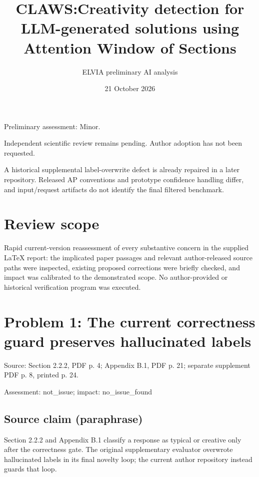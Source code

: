 \documentclass[11pt]{article}
\begin{document}
\title{CLAWS:Creativity detection for LLM-generated solutions using Attention Window of Sections}

\author{ELVIA preliminary AI analysis}\date{21 October 2026}\maketitle

Preliminary assessment: Minor.\par

Independent scientific review remains pending. Author adoption has not been requested.

A historical supplemental label-overwrite defect is already repaired in a later repository. Released AP conventions and prototype confidence handling differ, and input/request artifacts do not identify the final filtered benchmark.

\section*{Review scope}

Rapid current-version reassessment of every substantive concern in the supplied LaTeX report: the implicated paper passages and relevant author-released source paths were inspected, existing proposed corrections were briefly checked, and impact was calibrated to the demonstrated scope. No author-provided or historical verification program was executed.

\section*{Problem 1: The current correctness guard preserves hallucinated labels}

Source: Section 2.2.2, PDF p. 4; Appendix B.1, PDF p. 21; separate supplement PDF p. 8, printed p. 24.

Assessment: not\_issue; impact: no\_issue\_found

\subsection*{Source claim (paraphrase)}

Section 2.2.2 and Appendix B.1 classify a response as typical or creative only after the correctness gate. The original supplementary evaluator overwrote hallucinated labels in its final novelty loop; the current author repository instead guards that loop.
\end{document}
